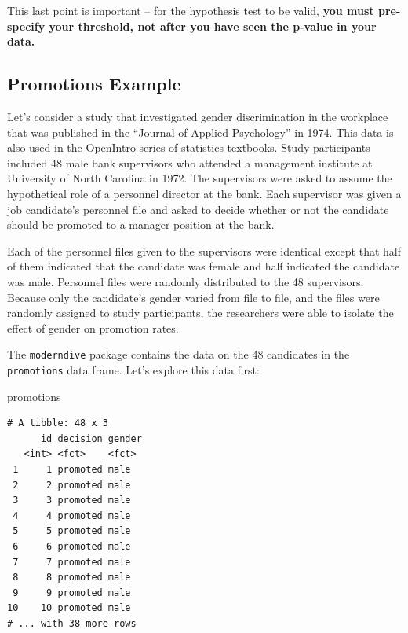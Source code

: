 \documentclass[
  letterpaper,
  DIV=11,
  numbers=noendperiod]{scrreprt}
\newenvironment{Shaded}{\begin{snugshade}}{\end{snugshade}}
\newcommand{\NormalTok}[1]{\textcolor[rgb]{0.00,0.23,0.31}{#1}}
\theoremstyle{definition}
\theoremstyle{remark}
\begin{document}
This last point is important -- for the hypothesis test to be valid,
\textbf{you must pre-specify your threshold, not after you have seen the
p-value in your data.}

\hypertarget{sec-ht-activity}{%
\subsection{Promotions Example}\label{sec-ht-activity}}

Let's consider a study that investigated gender discrimination in the
workplace that was published in the ``Journal of Applied Psychology'' in
1974. This data is also used in the
\href{https://www.openintro.org/}{OpenIntro} series of statistics
textbooks. Study participants included 48 male bank supervisors who
attended a management institute at University of North Carolina in 1972.
The supervisors were asked to assume the hypothetical role of a
personnel director at the bank. Each supervisor was given a job
candidate's personnel file and asked to decide whether or not the
candidate should be promoted to a manager position at the bank.

Each of the personnel files given to the supervisors were identical
except that half of them indicated that the candidate was female and
half indicated the candidate was male. Personnel files were randomly
distributed to the 48 supervisors. Because only the candidate's gender
varied from file to file, and the files were randomly assigned to study
participants, the researchers were able to isolate the effect of gender
on promotion rates.

The \texttt{moderndive} package contains the data on the 48 candidates
in the \texttt{promotions} data frame. Let's explore this data first:

\begin{Shaded}
\begin{Highlighting}[]
\NormalTok{promotions}
\end{Highlighting}
\end{Shaded}

\begin{verbatim}
# A tibble: 48 x 3
      id decision gender
   <int> <fct>    <fct> 
 1     1 promoted male  
 2     2 promoted male  
 3     3 promoted male  
 4     4 promoted male  
 5     5 promoted male  
 6     6 promoted male  
 7     7 promoted male  
 8     8 promoted male  
 9     9 promoted male  
10    10 promoted male  
# ... with 38 more rows
\end{verbatim}
\end{document}
